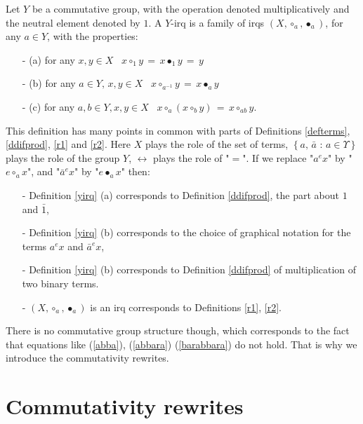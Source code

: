 \documentclass{article}
\begin{document}
\begin{definition}
Let $Y$ be a commutative group, with the operation denoted multiplicatively and the neutral element denoted by $1$. A $Y$-irq is a family of irqs $\displaystyle (X, \circ_{a}, \bullet_{a})$, for any $a \in Y$, with the properties: 
\begin{enumerate}
\item[-] (a) for any $x,y \in X$ \, $\displaystyle x \circ_{1} y \, = \, x \bullet_{1} y \, = \, y$
\item[-] (b) for any $a \in Y, \, x, y \in X$ \, $\displaystyle x \circ_{a^{-1}} y \, = \, x \bullet_{a} y$
\item[-] (c) for any $a, b \in Y, x, y \in X$ \, $x \circ_{a} ( x \circ_{b} y) \, = \, x \circ_{ab} y$.   
\end{enumerate}
\label{yirq}
\end{definition}

This definition has many points in common with parts of Definitions \ref{defterms}, \ref{ddifprod}, \ref{r1} and \ref{r2}. Here $X$ plays the role of the set of terms,  $\displaystyle \left\{ a, \, \bar{a} \mbox{ : } a \in \Upsilon\right\}$ plays the role of the group $Y$, $\displaystyle \longleftrightarrow$ plays the role of "$=$". If we replace "$\displaystyle a^{e} x$" by "$\displaystyle e \circ_{a} x$", and "$\displaystyle \bar{a}^{e} x$" by "$\displaystyle e \bullet_{a} x$" then: 
\begin{enumerate}
\item[-] Definition \ref{yirq} (a) corresponds to Definition \ref{ddifprod}, the part about $\displaystyle 1$ and $\displaystyle \bar{1}$, 
\item[-] Definition \ref{yirq} (b) corresponds to the choice of graphical notation for the terms $\displaystyle a^{e} x$ and $\displaystyle \bar{a}^{e} x$, 
\item[-] Definition \ref{yirq} (b) corresponds to Definition \ref{ddifprod} of multiplication of two binary terms.  
\item[-] $\displaystyle (X, \circ_{a}, \bullet_{a})$ is an irq corresponds to Definitions \ref{r1}, \ref{r2}.
\end{enumerate}
There is no commutative group structure though, which corresponds to the fact that equations like (\ref{abba}), (\ref{abbara}) (\ref{barabbara}) do not hold. That is why we introduce the commutativity rewrites.

\section{Commutativity rewrites}
\end{document}
